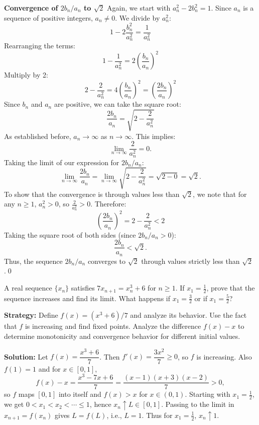 \textbf{Convergence of $2b_n/a_n$ to $\sqrt{2}$}
Again, we start with $a_n^2 - 2b_n^2 = 1$. Since $a_n$ is a sequence of positive integers, $a_n \neq 0$. We divide by $a_n^2$:
\[ 1 - 2\frac{b_n^2}{a_n^2} = \frac{1}{a_n^2} \]
Rearranging the terms:
\[ 1 - \frac{1}{a_n^2} = 2\left(\frac{b_n}{a_n}\right)^2 \]
Multiply by 2:
\[ 2 - \frac{2}{a_n^2} = 4\left(\frac{b_n}{a_n}\right)^2 = \left(\frac{2b_n}{a_n}\right)^2 \]
Since $b_n$ and $a_n$ are positive, we can take the square root:
\[ \frac{2b_n}{a_n} = \sqrt{2 - \frac{2}{a_n^2}} \]
As established before, $a_n \to \infty$ as $n \to \infty$. This implies:
\[ \lim_{n \to \infty} \frac{2}{a_n^2} = 0. \]
Taking the limit of our expression for $2b_n/a_n$:
\[ \lim_{n \to \infty} \frac{2b_n}{a_n} = \lim_{n \to \infty} \sqrt{2 - \frac{2}{a_n^2}} = \sqrt{2-0} = \sqrt{2}. \]
To show that the convergence is through values less than $\sqrt{2}$, we note that for any $n \geq 1$, $a_n^2 > 0$, so $\frac{2}{a_n^2} > 0$. Therefore:
\[ \left(\frac{2b_n}{a_n}\right)^2 = 2 - \frac{2}{a_n^2} < 2 \]
Taking the square root of both sides (since $2b_n/a_n > 0$):
\[ \frac{2b_n}{a_n} < \sqrt{2}. \]
Thus, the sequence $2b_n/a_n$ converges to $\sqrt{2}$ through values strictly less than $\sqrt{2}$.\qed
\medskip



\begin{problembox}
\begin{problemstatement}
A real sequence $\{x_n\}$ satisfies $7x_{n+1} = x_n^3 + 6$ for $n \geq 1$. If $x_1 = \frac{1}{2}$, prove that the sequence increases and find its limit. What happens if $x_1 = \frac{3}{2}$ or if $x_1 = \frac{5}{2}$?
\end{problemstatement}
\end{problembox}

\noindent\textbf{Strategy:} Define $f(x) = (x^3 + 6)/7$ and analyze its behavior. Use the fact that $f$ is increasing and find fixed points. Analyze the difference $f(x) - x$ to determine monotonicity and convergence behavior for different initial values.

\bigskip\noindent\textbf{Solution:}
Let $f(x)=\dfrac{x^3+6}{7}$. Then $f'(x)=\dfrac{3x^2}{7}\ge 0$, so $f$ is increasing. Also $f(1)=1$ and for $x\in[0,1]$,
\[
f(x)-x=\frac{x^3-7x+6}{7}=\frac{(x-1)(x+3)(x-2)}{7}>0,
\]
so $f$ maps $[0,1]$ into itself and $f(x)>x$ for $x\in(0,1)$. Starting with $x_1=\tfrac12$, we get $0<x_1<x_2<\cdots\le 1$, hence $x_n\uparrow L\in[0,1]$. Passing to the limit in $x_{n+1}=f(x_n)$ gives $L=f(L)$, i.e., $L=\textbf{$1$}$. Thus for $x_1=\tfrac12$, $x_n\uparrow \textbf{$1$}$.

